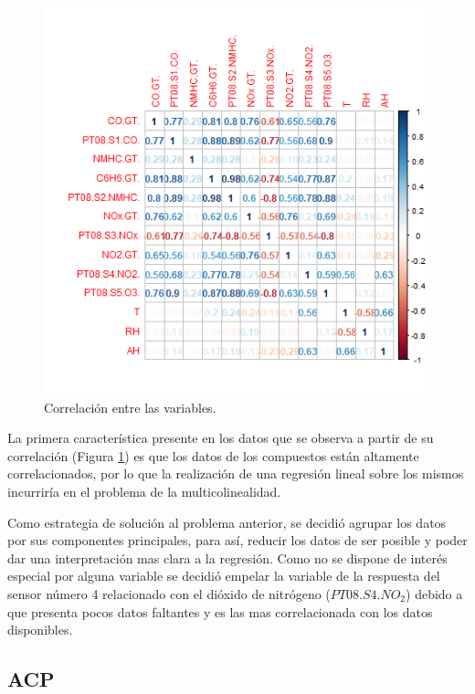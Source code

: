 \documentclass[a4paper,10pt,twocolumn]{article}
\begin{document}
   \begin{figure}[htb]%
   	\begin{center}
   		\includegraphics[width=\linewidth]{Images/correlation1.png}
   	\end{center}
   	\caption{Correlación entre las variables.}
   	\label{fig:corr1}
   \end{figure}

  La primera característica presente en los datos que se observa a partir de su correlación (Figura \ref{fig:corr1}) es que los datos de los compuestos están altamente correlacionados, por lo que la realización de una regresión lineal sobre los mismos incurriría en el problema de la multicolinealidad. 
  
  Como estrategia de solución al problema anterior, se decidió agrupar los datos por sus componentes principales, para así, reducir los datos de ser posible y poder dar una interpretación mas clara a la regresión. Como no se dispone de interés especial por alguna variable se decidió empelar la variable de la respuesta del sensor número 4 relacionado con el dióxido de nitrógeno ($PT08.S4.NO_2$) debido a que presenta pocos datos faltantes y es las mas correlacionada con los datos disponibles.
  
 \subsection{ACP} 
 
\end{document}
